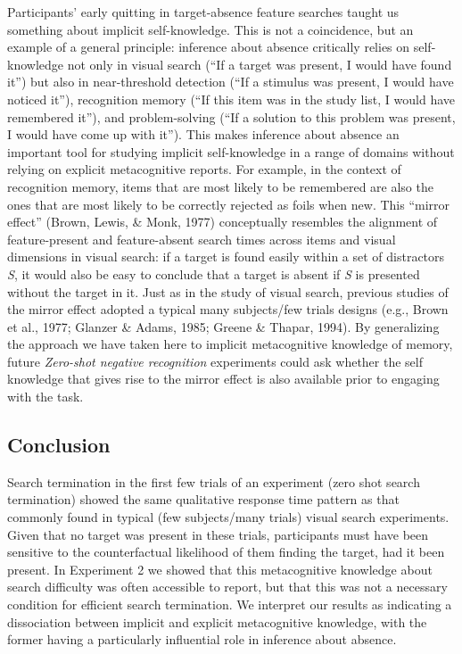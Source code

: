 \documentclass[
  english,
  man]{apa6}
\begin{document}
Participants' early quitting in target-absence feature searches taught us something about implicit self-knowledge. This is not a coincidence, but an example of a general principle: inference about absence critically relies on self-knowledge not only in visual search (\enquote{If a target was present, I would have found it}) but also in near-threshold detection (\enquote{If a stimulus was present, I would have noticed it}), recognition memory (\enquote{If this item was in the study list, I would have remembered it}), and problem-solving (\enquote{If a solution to this problem was present, I would have come up with it}). This makes inference about absence an important tool for studying implicit self-knowledge in a range of domains without relying on explicit metacognitive reports. For example, in the context of recognition memory, items that are most likely to be remembered are also the ones that are most likely to be correctly rejected as foils when new. This \enquote{mirror effect} (Brown, Lewis, \& Monk, 1977) conceptually resembles the alignment of feature-present and feature-absent search times across items and visual dimensions in visual search: if a target is found easily within a set of distractors \emph{S}, it would also be easy to conclude that a target is absent if \emph{S} is presented without the target in it. Just as in the study of visual search, previous studies of the mirror effect adopted a typical many subjects/few trials designs (e.g., Brown et al., 1977; Glanzer \& Adams, 1985; Greene \& Thapar, 1994). By generalizing the approach we have taken here to implicit metacognitive knowledge of memory, future \emph{Zero-shot negative recognition} experiments could ask whether the self knowledge that gives rise to the mirror effect is also available prior to engaging with the task.

\hypertarget{conclusion}{%
\subsection{Conclusion}\label{conclusion}}

Search termination in the first few trials of an experiment (zero shot search termination) showed the same qualitative response time pattern as that commonly found in typical (few subjects/many trials) visual search experiments. Given that no target was present in these trials, participants must have been sensitive to the counterfactual likelihood of them finding the target, had it been present. In Experiment 2 we showed that this metacognitive knowledge about search difficulty was often accessible to report, but that this was not a necessary condition for efficient search termination. We interpret our results as indicating a dissociation between implicit and explicit metacognitive knowledge, with the former having a particularly influential role in inference about absence.
\end{document}

